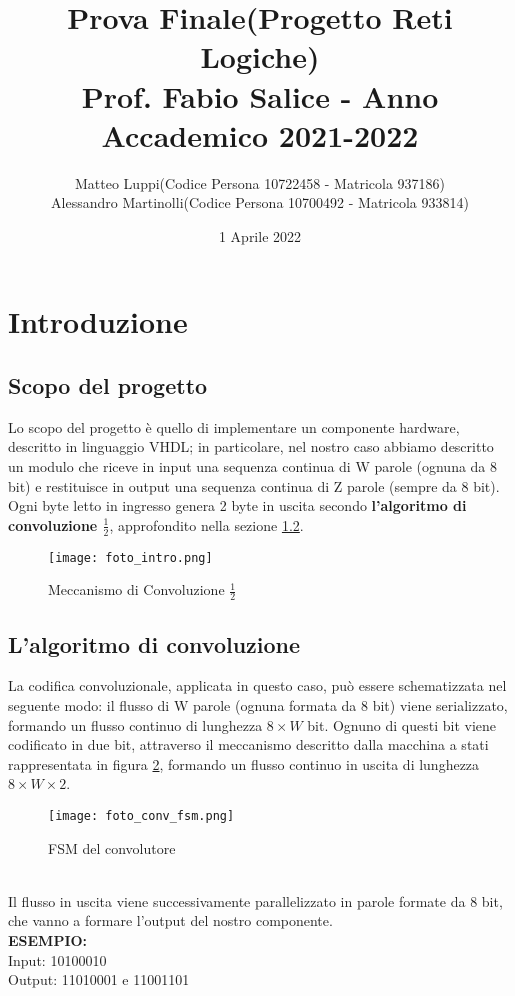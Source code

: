\documentclass[a4paper]{article}
\title{%
      \textbf{\LARGE Prova Finale(Progetto Reti Logiche)}\\
       {\Large Prof. Fabio Salice - Anno Accademico 2021-2022}}
\author{Matteo Luppi(Codice Persona 10722458 - Matricola 937186)
    \\ Alessandro Martinolli(Codice Persona 10700492  - Matricola 933814)}
\date{1 Aprile 2022}
\begin{document}
\maketitle
\tableofcontents
\clearpage
\section{Introduzione}
\subsection{Scopo del progetto}
Lo scopo del progetto è quello di implementare un componente hardware, descritto in linguaggio VHDL; in particolare, nel nostro caso abbiamo descritto un modulo che riceve in input una sequenza continua di W parole (ognuna da 8 bit) e restituisce in output una sequenza continua di Z parole (sempre da 8 bit). Ogni byte letto in ingresso genera 2 byte in uscita secondo \textbf{l'algoritmo di convoluzione $\frac{1}{2}$}, approfondito nella sezione \ref{Algoritmo}.

\begin{figure}[htp]
    \centering
    \texttt{[image: foto\_intro.png]}
    \caption{Meccanismo di Convoluzione $\frac{1}{2}$}
    \label{fig:foto_intro}
\end{figure}
\subsection{L'algoritmo di convoluzione}
\label{Algoritmo}
La codifica convoluzionale, applicata in questo caso, può essere schematizzata nel seguente modo: il flusso di W parole (ognuna formata da 8 bit) viene serializzato, formando un flusso continuo di lunghezza ${8}\times{W}$ bit. Ognuno di questi bit viene codificato in due bit, attraverso il meccanismo descritto dalla macchina a stati rappresentata in figura \ref{fig:FSM_convolutore}, formando un flusso continuo in uscita di lunghezza ${8}\times{W}\times{2}$.
\begin{figure}[htp]
    \texttt{[image: foto\_conv\_fsm.png]}
    \caption{FSM del convolutore}
    \label{fig:FSM_convolutore}
\end{figure}
\\
Il flusso in uscita viene successivamente parallelizzato in parole formate da 8 bit, che vanno a formare l'output del nostro componente.
\\
\textbf{\normalsize{ESEMPIO:}}
\\
Input: 10100010 
\\
Output: 11010001 e 11001101
\end{document}
